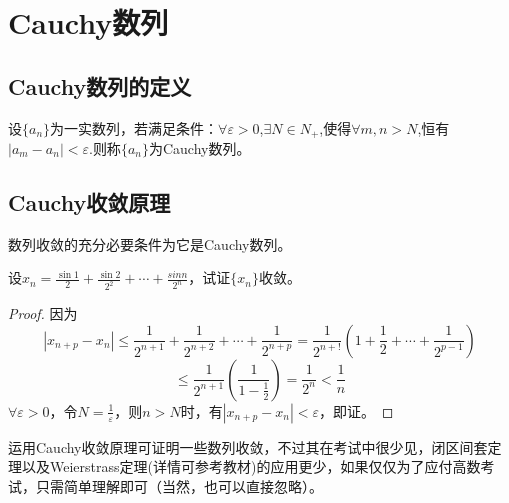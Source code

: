 \section{Cauchy数列}
\subsection{Cauchy数列的定义}
\begin{definition}
	设$\{a_n\}$为一实数列，若满足条件：$\forall \varepsilon >0$,$\exists N \in N_+$,使得$\forall m,n>N$,恒有$|a_m-a_n|<\varepsilon.$则称$\{a_n\}$为Cauchy数列。
\end{definition}
\subsection{Cauchy收敛原理}
数列收敛的充分必要条件为它是Cauchy数列。
\begin{example}
	设$x_n=\frac{\sin 1}{2}+\frac{\sin 2}{2^2}+\cdots+\frac{sin n}{2^n}$，试证$\{x_n\}$收敛。
	\begin{proof}
		因为
		$$|x_{n+p}-x_n| \leq \frac{1}{2^{n+1}}+\frac{1}{2^{n+2}}+\cdots+\frac{1}{2^{n+p}}=\frac{1}{2^{n+!}}(1+\frac{1}{2}+\cdots+\frac{1}{2^{p-1}}) $$
		$$\leq \frac{1}{2^{n+1}}(\frac{1}{1-\frac{1}{2}})=\frac{1}{2^n}<\frac{1}{n}$$
		$\forall \varepsilon >0$，令$N=\frac{1}{\varepsilon}$，则$n>N$时，有$|x_{n+p}-x_n|<\varepsilon$，即证。
	\end{proof}
\end{example}
\begin{remark}
	运用Cauchy收敛原理可证明一些数列收敛，不过其在考试中很少见，闭区间套定理以及Weierstrass定理(详情可参考教材)的应用更少，如果仅仅为了应付高数考试，只需简单理解即可（当然，也可以直接忽略）。
\end{remark}